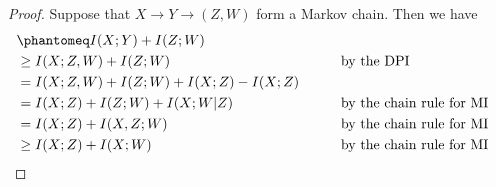 \documentclass[
  coursecode={MTHE 474},
  assignmentname={Homework \homeworknumber},
  studentnumber=20053722,
  name={Bryan Hoang},
  draft,
]{
  ltxanswer%
}
\begin{document}
  \begin{questions}
    \setcounter{question}{\questionnumber}
    \addtocounter{question}{-1}
    \question[15]{}
    \begin{solution}
      \begin{proof}
        Suppose that \(X \rightarrow Y \rightarrow (Z,W)\) form a Markov chain.
        Then we have
        \begin{align*}
           &\phantomeq I(X;Y) + I(Z;W)                                                      \\
           &\ge I(X;Z,W) + I(Z;W)                 & &\qquad \text{by the DPI}               \\
           &= I(X;Z,W) + I(Z;W) + I(X;Z) - I(X;Z)                                           \\
           &= I(X;Z) + I(Z;W) + I(X;W|Z)          & &\qquad \text{by the chain rule for MI} \\
           &= I(X;Z) + I(X,Z;W)                   & &\qquad \text{by the chain rule for MI} \\
           &\ge I(X;Z) + I(X;W)                   & &\qquad \text{by the chain rule for MI} \\
        \end{align*}
      \end{proof}
    \end{solution}
  \end{questions}
\end{document}
